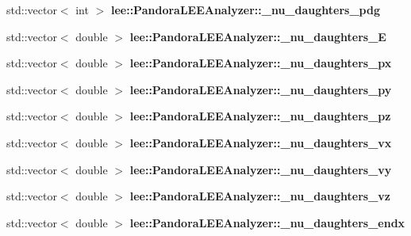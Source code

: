 \begin{DoxyCompactItemize}
\item 
\hypertarget{group__lee_gaaacddd2332477a23f786ee4c854d3e61}{std\-::vector$<$ int $>$ {\bfseries lee\-::\-Pandora\-L\-E\-E\-Analyzer\-::\-\_\-nu\-\_\-daughters\-\_\-pdg}}\label{group__lee_gaaacddd2332477a23f786ee4c854d3e61}

\item 
\hypertarget{group__lee_gac1d71f8ed82068b3a02d9a37905bf195}{std\-::vector$<$ double $>$ {\bfseries lee\-::\-Pandora\-L\-E\-E\-Analyzer\-::\-\_\-nu\-\_\-daughters\-\_\-\-E}}\label{group__lee_gac1d71f8ed82068b3a02d9a37905bf195}

\item 
\hypertarget{group__lee_gaa834071311edb5ffa50db6132496fb95}{std\-::vector$<$ double $>$ {\bfseries lee\-::\-Pandora\-L\-E\-E\-Analyzer\-::\-\_\-nu\-\_\-daughters\-\_\-px}}\label{group__lee_gaa834071311edb5ffa50db6132496fb95}

\item 
\hypertarget{group__lee_ga3e2b79305694205bc16527e7d086058a}{std\-::vector$<$ double $>$ {\bfseries lee\-::\-Pandora\-L\-E\-E\-Analyzer\-::\-\_\-nu\-\_\-daughters\-\_\-py}}\label{group__lee_ga3e2b79305694205bc16527e7d086058a}

\item 
\hypertarget{group__lee_ga838abd41f7c806c0242d1d612e1a3c80}{std\-::vector$<$ double $>$ {\bfseries lee\-::\-Pandora\-L\-E\-E\-Analyzer\-::\-\_\-nu\-\_\-daughters\-\_\-pz}}\label{group__lee_ga838abd41f7c806c0242d1d612e1a3c80}

\item 
\hypertarget{group__lee_ga35e3d0f602ee460d83440447698baef1}{std\-::vector$<$ double $>$ {\bfseries lee\-::\-Pandora\-L\-E\-E\-Analyzer\-::\-\_\-nu\-\_\-daughters\-\_\-vx}}\label{group__lee_ga35e3d0f602ee460d83440447698baef1}

\item 
\hypertarget{group__lee_gaa564f473e072ce7fc9702781805907bd}{std\-::vector$<$ double $>$ {\bfseries lee\-::\-Pandora\-L\-E\-E\-Analyzer\-::\-\_\-nu\-\_\-daughters\-\_\-vy}}\label{group__lee_gaa564f473e072ce7fc9702781805907bd}

\item 
\hypertarget{group__lee_gadda9ce5e644a8f78ef769f443990ab20}{std\-::vector$<$ double $>$ {\bfseries lee\-::\-Pandora\-L\-E\-E\-Analyzer\-::\-\_\-nu\-\_\-daughters\-\_\-vz}}\label{group__lee_gadda9ce5e644a8f78ef769f443990ab20}

\item 
\hypertarget{group__lee_ga2c05930087430260a4ba4f26beb8355b}{std\-::vector$<$ double $>$ {\bfseries lee\-::\-Pandora\-L\-E\-E\-Analyzer\-::\-\_\-nu\-\_\-daughters\-\_\-endx}}\label{group__lee_ga2c05930087430260a4ba4f26beb8355b}


\end{DoxyCompactItemize}
